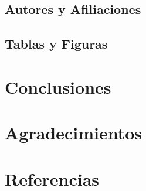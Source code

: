     
    
    
    \subsection{Autores y Afiliaciones}
    
    \subsection{Tablas y Figuras}
    
    \section{Conclusiones}
    
    
    
    \section{Agradecimientos}
    
    
    \section{Referencias}
    
    
    
    
    \appendix
    \label{Figura:instructivo}
    
    \label{Figura:Materiales}
    
    \label{Figura: DigBim}
    
    
    \label{Figura:TablasMTM}
    
    
    \newpage
    
    
